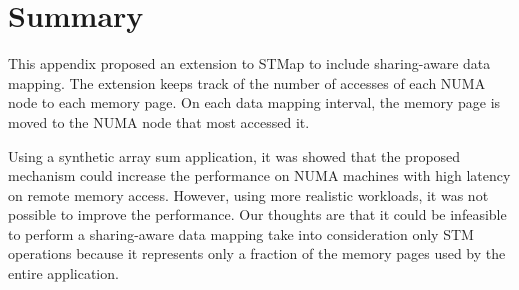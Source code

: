 \section{Summary}
This appendix proposed an extension to STMap to include sharing-aware data mapping. The extension keeps track of the number of accesses of each NUMA node to each memory page. On each data mapping interval, the memory page is moved to the NUMA node that most accessed it. 

Using a synthetic array sum application, it was showed that the proposed mechanism could increase the performance on NUMA machines with high latency on remote memory access. However, using more realistic workloads, it was not possible to improve the performance. Our thoughts are that it could be infeasible to perform a sharing-aware data mapping take into consideration only STM operations because it represents only a fraction of the memory pages used by the entire application.
